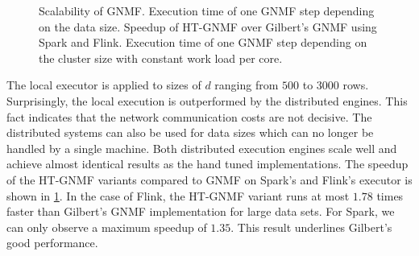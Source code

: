 \begin{figure}[!h]
\begin{subfigure}{\dualpgfwidth}
		\caption{}
		\label{fig:gnmfSpeedup}
	\end{subfigure}
	\begin{subfigure}{\dualpgfwidth}
		\caption{}
		\label{fig:nmfNodesRuntime}
	\end{subfigure}
	\caption{Scalability of GNMF.  Execution time of one GNMF step depending on the data size.  Speedup of HT-GNMF over Gilbert's GNMF using Spark and Flink.  Execution time of one GNMF step depending on the cluster size with constant work load per core.}
	\label{fig:nmfBenchmark}
\end{figure}

The local executor is applied to sizes of $d$ ranging from $500$ to $3000$ rows.
Surprisingly, the local execution is outperformed by the distributed engines.
This fact indicates that the network communication costs are not decisive.
The distributed systems can also be used for data sizes which can no longer be handled by a single machine.
Both distributed execution engines scale well and achieve almost identical results as the hand tuned implementations.
The speedup of the HT-GNMF variants compared to GNMF on Spark's and Flink's executor is shown in \cref{fig:gnmfSpeedup}.
In the case of Flink, the HT-GNMF variant runs at most $1.78$ times faster than Gilbert's GNMF implementation for large data sets.
For Spark, we can only observe a maximum speedup of $1.35$.
This result underlines Gilbert's good performance.


